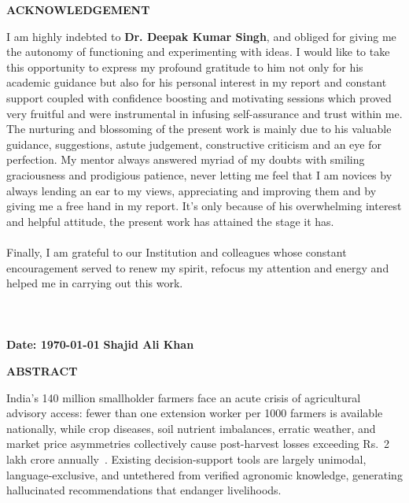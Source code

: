 \documentclass[12pt,a4paper]{article}
\providecommand{\textrupee}{Rs.~}
\begin{document}
\begin{center}
	{\large \bf ACKNOWLEDGEMENT}
\end{center}
I am highly indebted to {\bf Dr. Deepak Kumar Singh}, and obliged for giving me the autonomy of functioning and experimenting with ideas. I would like to take this opportunity to express my profound gratitude to him
not only for his academic guidance but also for his personal interest in my report and constant support coupled with confidence boosting and motivating sessions which proved very fruitful and were instrumental in infusing self-assurance and trust within me. The nurturing and blossoming of the present work is mainly due to his valuable guidance,
suggestions, astute judgement, constructive criticism and an eye for perfection. My mentor always answered myriad of my doubts with smiling graciousness and prodigious patience, never letting me feel that I am novices by always lending an ear to my views, appreciating and improving them and by giving me a free hand in my report. It's only because of his overwhelming interest and helpful attitude, the present work has attained the stage it has. \\
\\
Finally, I am grateful to our Institution and colleagues whose constant encouragement served to renew my spirit, refocus my attention and energy and helped me in carrying out this work.\\ \\ \\ \\
\vspace{0.7in}
\textbf{Date: \today}
\hfill
\textbf{Shajid Ali Khan}
\clearpage


\clearpage
\begin{center}
	{\large \bf ABSTRACT}
\end{center}

India's 140 million smallholder farmers face an acute crisis of agricultural advisory access: fewer than one extension worker per 1000 farmers is available nationally, while crop diseases, soil nutrient imbalances, erratic weather, and market price asymmetries collectively cause post-harvest losses exceeding \textrupee{}2 lakh crore annually~\cite{fao2022,nabard2023}. Existing decision-support tools are largely unimodal, language-exclusive, and untethered from verified agronomic knowledge, generating hallucinated recommendations that endanger livelihoods.
\end{document}

